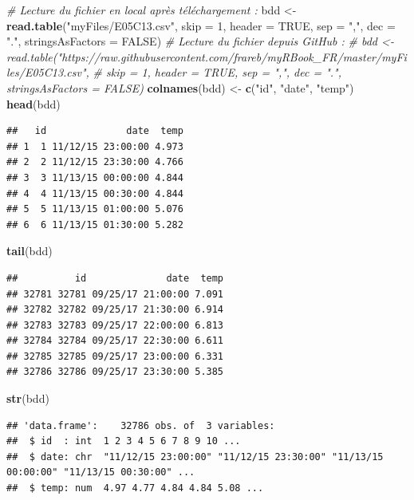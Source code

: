 \documentclass[]{book}
\newenvironment{Shaded}{\begin{snugshade}}{\end{snugshade}}
\newcommand{\CommentTok}[1]{\textcolor[rgb]{0.56,0.35,0.01}{\textit{#1}}}
\newcommand{\DataTypeTok}[1]{\textcolor[rgb]{0.13,0.29,0.53}{#1}}
\newcommand{\DecValTok}[1]{\textcolor[rgb]{0.00,0.00,0.81}{#1}}
\newcommand{\KeywordTok}[1]{\textcolor[rgb]{0.13,0.29,0.53}{\textbf{#1}}}
\newcommand{\NormalTok}[1]{#1}
\newcommand{\OtherTok}[1]{\textcolor[rgb]{0.56,0.35,0.01}{#1}}
\newcommand{\StringTok}[1]{\textcolor[rgb]{0.31,0.60,0.02}{#1}}
\begin{document}
\begin{Shaded}
\begin{Highlighting}[]
\CommentTok{# Lecture du fichier en local après téléchargement : }
\NormalTok{bdd <-}\StringTok{ }\KeywordTok{read.table}\NormalTok{(}\StringTok{"myFiles/E05C13.csv"}\NormalTok{, }\DataTypeTok{skip =} \DecValTok{1}\NormalTok{, }\DataTypeTok{header =} \OtherTok{TRUE}\NormalTok{, }
  \DataTypeTok{sep =} \StringTok{","}\NormalTok{, }\DataTypeTok{dec =} \StringTok{"."}\NormalTok{, }\DataTypeTok{stringsAsFactors =} \OtherTok{FALSE}\NormalTok{)}
\CommentTok{# Lecture du fichier depuis GitHub : }
\CommentTok{# bdd <- read.table("https://raw.githubusercontent.com/frareb/myRBook_FR/master/myFiles/E05C13.csv", }
\CommentTok{#   skip = 1, header = TRUE, sep = ",", dec = ".", stringsAsFactors = FALSE)}
\KeywordTok{colnames}\NormalTok{(bdd) <-}\StringTok{ }\KeywordTok{c}\NormalTok{(}\StringTok{"id"}\NormalTok{, }\StringTok{"date"}\NormalTok{, }\StringTok{"temp"}\NormalTok{)}
\KeywordTok{head}\NormalTok{(bdd)}
\end{Highlighting}
\end{Shaded}

\begin{verbatim}
##   id              date  temp
## 1  1 11/12/15 23:00:00 4.973
## 2  2 11/12/15 23:30:00 4.766
## 3  3 11/13/15 00:00:00 4.844
## 4  4 11/13/15 00:30:00 4.844
## 5  5 11/13/15 01:00:00 5.076
## 6  6 11/13/15 01:30:00 5.282
\end{verbatim}

\begin{Shaded}
\begin{Highlighting}[]
\KeywordTok{tail}\NormalTok{(bdd)}
\end{Highlighting}
\end{Shaded}

\begin{verbatim}
##          id              date  temp
## 32781 32781 09/25/17 21:00:00 7.091
## 32782 32782 09/25/17 21:30:00 6.914
## 32783 32783 09/25/17 22:00:00 6.813
## 32784 32784 09/25/17 22:30:00 6.611
## 32785 32785 09/25/17 23:00:00 6.331
## 32786 32786 09/25/17 23:30:00 5.385
\end{verbatim}

\begin{Shaded}
\begin{Highlighting}[]
\KeywordTok{str}\NormalTok{(bdd)}
\end{Highlighting}
\end{Shaded}

\begin{verbatim}
## 'data.frame':    32786 obs. of  3 variables:
##  $ id  : int  1 2 3 4 5 6 7 8 9 10 ...
##  $ date: chr  "11/12/15 23:00:00" "11/12/15 23:30:00" "11/13/15 00:00:00" "11/13/15 00:30:00" ...
##  $ temp: num  4.97 4.77 4.84 4.84 5.08 ...
\end{verbatim}
\end{document}
